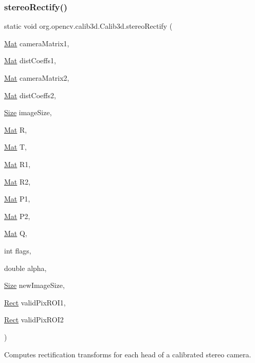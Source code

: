 \subsubsection{\texorpdfstring{stereo\+Rectify()}{stereoRectify()}\hspace{0.1cm}{\footnotesize\ttfamily [1/2]}}
{\footnotesize\ttfamily static void org.\+opencv.\+calib3d.\+Calib3d.\+stereo\+Rectify (\begin{DoxyParamCaption}\item[{\mbox{\hyperlink{classorg_1_1opencv_1_1core_1_1_mat}{Mat}}}]{camera\+Matrix1,  }\item[{\mbox{\hyperlink{classorg_1_1opencv_1_1core_1_1_mat}{Mat}}}]{dist\+Coeffs1,  }\item[{\mbox{\hyperlink{classorg_1_1opencv_1_1core_1_1_mat}{Mat}}}]{camera\+Matrix2,  }\item[{\mbox{\hyperlink{classorg_1_1opencv_1_1core_1_1_mat}{Mat}}}]{dist\+Coeffs2,  }\item[{\mbox{\hyperlink{classorg_1_1opencv_1_1core_1_1_size}{Size}}}]{image\+Size,  }\item[{\mbox{\hyperlink{classorg_1_1opencv_1_1core_1_1_mat}{Mat}}}]{R,  }\item[{\mbox{\hyperlink{classorg_1_1opencv_1_1core_1_1_mat}{Mat}}}]{T,  }\item[{\mbox{\hyperlink{classorg_1_1opencv_1_1core_1_1_mat}{Mat}}}]{R1,  }\item[{\mbox{\hyperlink{classorg_1_1opencv_1_1core_1_1_mat}{Mat}}}]{R2,  }\item[{\mbox{\hyperlink{classorg_1_1opencv_1_1core_1_1_mat}{Mat}}}]{P1,  }\item[{\mbox{\hyperlink{classorg_1_1opencv_1_1core_1_1_mat}{Mat}}}]{P2,  }\item[{\mbox{\hyperlink{classorg_1_1opencv_1_1core_1_1_mat}{Mat}}}]{Q,  }\item[{int}]{flags,  }\item[{double}]{alpha,  }\item[{\mbox{\hyperlink{classorg_1_1opencv_1_1core_1_1_size}{Size}}}]{new\+Image\+Size,  }\item[{\mbox{\hyperlink{classorg_1_1opencv_1_1core_1_1_rect}{Rect}}}]{valid\+Pix\+R\+O\+I1,  }\item[{\mbox{\hyperlink{classorg_1_1opencv_1_1core_1_1_rect}{Rect}}}]{valid\+Pix\+R\+O\+I2 }\end{DoxyParamCaption})\hspace{0.3cm}{\ttfamily [static]}}

Computes rectification transforms for each head of a calibrated stereo camera.

